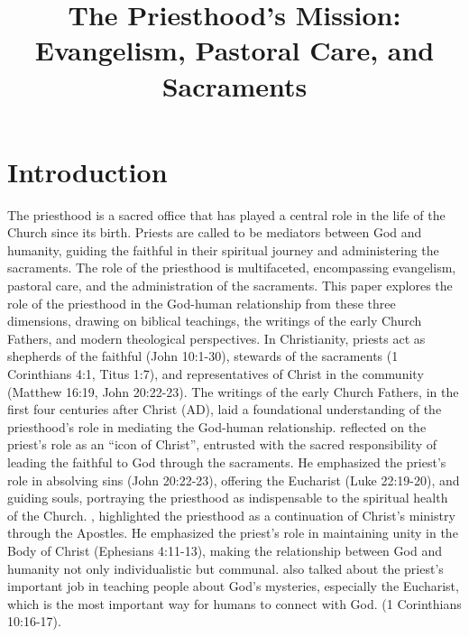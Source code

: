 \documentclass[12pt, doc]{apa7}   	%
\title{The Priesthood’s Mission: Evangelism, Pastoral Care, and Sacraments}	%
\begin{document}
\maketitle

\section{Introduction}
The priesthood is a sacred office that has played a central role in the life of the Church since its birth. Priests are called to be mediators between God and humanity, guiding the faithful in their spiritual journey and administering the sacraments. The role of the priesthood is multifaceted, encompassing evangelism, pastoral care, and the administration of the sacraments. This paper explores the role of the priesthood in the God-human relationship from these three dimensions, drawing on biblical teachings, the writings of the early Church Fathers, and modern theological perspectives.  In Christianity, priests act as shepherds of the faithful (John 10:1-30), stewards of the sacraments (1 Corinthians 4:1, Titus 1:7), and representatives of Christ in the community (Matthew 16:19, John 20:22-23). The writings of the early Church Fathers, in the first four centuries after Christ (AD), laid a foundational understanding of the priesthood’s role in mediating the God-human relationship.  \citet{priesthood_chrysostom, complete_work_chrysostom} reflected on the priest’s role as an ``icon of Christ'', entrusted with the sacred responsibility of leading the faithful to God through the sacraments. He emphasized the priest’s role in absolving sins (John 20:22-23), offering the Eucharist (Luke 22:19-20), and guiding souls, portraying the priesthood as indispensable to the spiritual health of the Church.  \citet{epistles_ignatius}, highlighted the priesthood as a continuation of Christ’s ministry through the Apostles. He emphasized the priest’s role in maintaining unity in the Body of Christ (Ephesians 4:11-13), making the relationship between God and humanity not only individualistic but communal. \citet{st_basil_letters} also talked about the priest’s important job in teaching people about God’s mysteries, especially the Eucharist, which is the most important way for humans to connect with God. (1 Corinthians 10:16-17). 
\end{document}

